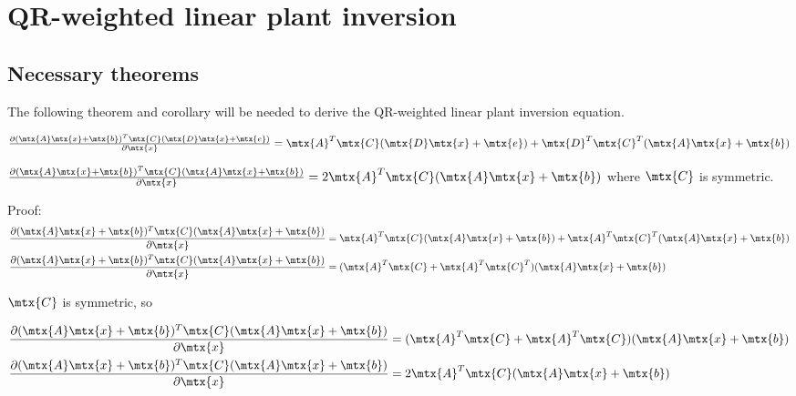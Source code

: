 
\chapter{QR-weighted linear plant inversion}

\section{Necessary theorems}

The following theorem and corollary will be needed to derive the QR-weighted
linear plant inversion equation.
\begin{theorem}
  $\frac{\partial (\mtx{A}\mtx{x} + \mtx{b})^T\mtx{C}
    (\mtx{D}\mtx{x} + \mtx{e})}{\partial\mtx{x}} =
    \mtx{A}^T\mtx{C}(\mtx{D}\mtx{x} + \mtx{e}) + \mtx{D}^T\mtx{C}^T
    (\mtx{A}\mtx{x} + \mtx{b})$
\end{theorem}
\begin{corollary}
  \label{cor:partial_ax_b}

  $\frac{\partial (\mtx{A}\mtx{x} + \mtx{b})^T\mtx{C}
    (\mtx{A}\mtx{x} + \mtx{b})}{\partial\mtx{x}} =
    2\mtx{A}^T\mtx{C}(\mtx{A}\mtx{x} + \mtx{b})$ where $\mtx{C}$ is symmetric.

  Proof:
  \begin{align*}
    \frac{\partial (\mtx{A}\mtx{x} + \mtx{b})^T\mtx{C}
      (\mtx{A}\mtx{x} + \mtx{b})}{\partial\mtx{x}} &=
      \mtx{A}^T\mtx{C}(\mtx{A}\mtx{x} + \mtx{b}) + \mtx{A}^T\mtx{C}^T
      (\mtx{A}\mtx{x} + \mtx{b}) \\
    \frac{\partial (\mtx{A}\mtx{x} + \mtx{b})^T\mtx{C}
      (\mtx{A}\mtx{x} + \mtx{b})}{\partial\mtx{x}} &=
      (\mtx{A}^T\mtx{C} + \mtx{A}^T\mtx{C}^T)(\mtx{A}\mtx{x} + \mtx{b})
  \end{align*}

  $\mtx{C}$ is symmetric, so

  \begin{align*}
    \frac{\partial (\mtx{A}\mtx{x} + \mtx{b})^T\mtx{C}
      (\mtx{A}\mtx{x} + \mtx{b})}{\partial\mtx{x}} &=
      (\mtx{A}^T\mtx{C} + \mtx{A}^T\mtx{C})(\mtx{A}\mtx{x} + \mtx{b}) \\
    \frac{\partial (\mtx{A}\mtx{x} + \mtx{b})^T\mtx{C}
      (\mtx{A}\mtx{x} + \mtx{b})}{\partial\mtx{x}} &=
      2\mtx{A}^T\mtx{C}(\mtx{A}\mtx{x} + \mtx{b})
  \end{align*}
\end{corollary}

